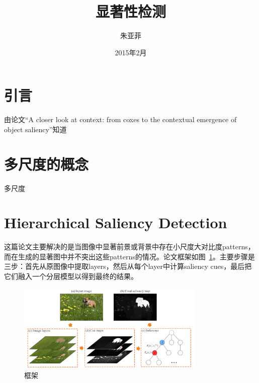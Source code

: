 \documentclass[12pt]{article}
\begin{document}
\title{\vspace{-2em}显著性检测\vspace{-0.7em}}
\author{朱亚菲}
\date{\vspace{-0.7em}2015年2月\vspace{-0.7em}}
\maketitle\thispagestyle{fancy}
\maketitle
\tableofcontents 

\section{引言}

由论文“A closer look at context: from coxes to the contextual emergence of object saliency”知道


\section{多尺度的概念}

多尺度

\section{Hierarchical Saliency Detection}

这篇论文主要解决的是当图像中显著前景或背景中存在小尺度大对比度patterns，而在生成的显著图中并不突出这些patterns的情况。论文框架如图~\ref{fig: hsaliency1}。主要步骤是三步：首先从原图像中提取layers，然后从每个layer中计算saliency cues，最后把它们融入一个分层模型以得到最终的结果。

\begin{figure}[!ht]
\centering
\includegraphics[width=0.8\textwidth]{hsaliency1.png}
\caption{框架}
\label{fig: hsaliency1}
\end{figure} 
\end{document}
